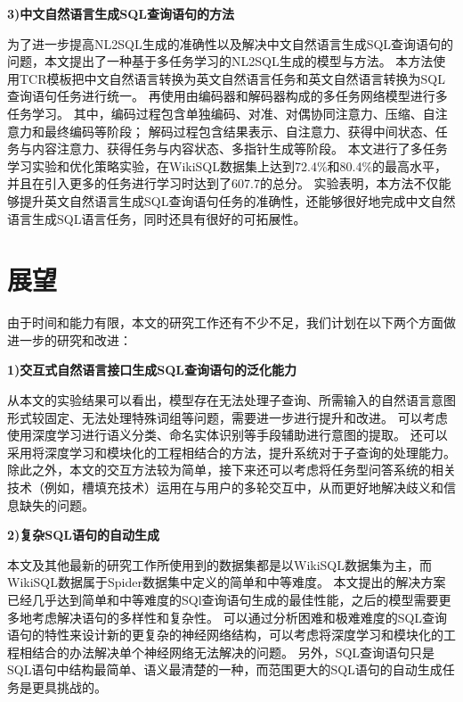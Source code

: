 \textbf{3)中文自然语言生成SQL查询语句的方法}

为了进一步提高NL2SQL生成的准确性以及解决中文自然语言生成SQL查询语句的问题，本文提出了一种基于多任务学习的NL2SQL生成的模型与方法。
本方法使用TCR模板把中文自然语言转换为英文自然语言任务和英文自然语言转换为SQL查询语句任务进行统一。
再使用由编码器和解码器构成的多任务网络模型进行多任务学习。
其中，编码过程包含单独编码、对准、对偶协同注意力、压缩、自注意力和最终编码等阶段；
解码过程包含结果表示、自注意力、获得中间状态、任务与内容注意力、获得任务与内容状态、多指针生成等阶段。
本文进行了多任务学习实验和优化策略实验，在WikiSQL数据集上达到72.4\%和80.4\%的最高水平，并且在引入更多的任务进行学习时达到了607.7的总分。
实验表明，本方法不仅能够提升英文自然语言生成SQL查询语句任务的准确性，还能够很好地完成中文自然语言生成SQL语言任务，同时还具有很好的可拓展性。


\section{展望}

由于时间和能力有限，本文的研究工作还有不少不足，我们计划在以下两个方面做进一步的研究和改进：

\textbf{1)交互式自然语言接口生成SQL查询语句的泛化能力}

从本文的实验结果可以看出，模型存在无法处理子查询、所需输入的自然语言意图形式较固定、无法处理特殊词组等问题，需要进一步进行提升和改进。
可以考虑使用深度学习进行语义分类、命名实体识别等手段辅助进行意图的提取。
还可以采用将深度学习和模块化的工程相结合的方法，提升系统对于子查询的处理能力。
除此之外，本文的交互方法较为简单，接下来还可以考虑将任务型问答系统的相关技术（例如，槽填充技术）运用在与用户的多轮交互中，从而更好地解决歧义和信息缺失的问题。


\textbf{2)复杂SQL语句的自动生成}

本文及其他最新的研究工作所使用到的数据集都是以WikiSQL数据集为主，而WikiSQL数据属于Spider数据集中定义的简单和中等难度。
本文提出的解决方案已经几乎达到简单和中等难度的SQl查询语句生成的最佳性能，之后的模型需要更多地考虑解决语句的多样性和复杂性。
可以通过分析困难和极难难度的SQL查询语句的特性来设计新的更复杂的神经网络结构，可以考虑将深度学习和模块化的工程相结合的办法解决单个神经网络无法解决的问题。
另外，SQL查询语句只是SQL语句中结构最简单、语义最清楚的一种，而范围更大的SQL语句的自动生成任务是更具挑战的。

